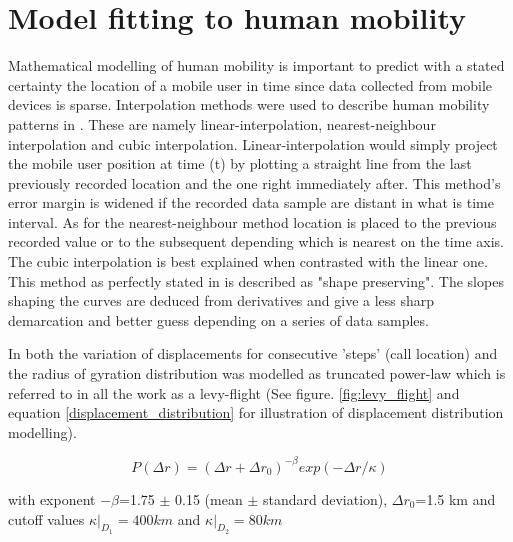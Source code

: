 \documentclass[12pt, a4paper]{report}
\theoremstyle{definition}
\theoremstyle{definition}%
\theoremstyle{definition}%
\theoremstyle{definition}%
\theoremstyle{definition}%
\theoremstyle{definition}%
\begin{document}
\section{Model fitting to human mobility} \label{methodology_modelling}
Mathematical modelling of human mobility is important to predict with a stated certainty the location of a mobile user in time since data collected from mobile devices is sparse. Interpolation methods were used to describe human mobility patterns in \cite{Hoteit2014}. These are namely linear-interpolation, nearest-neighbour interpolation and cubic interpolation. Linear-interpolation would simply project the mobile user position at time (t) by plotting a straight line from the last previously recorded location and the one right immediately after. This method's error margin is widened if the recorded data sample are distant in what is time interval. As for the nearest-neighbour method location is placed to the previous recorded value or to the subsequent depending which is nearest on the time axis. The cubic interpolation is best explained when contrasted with the linear one. This method as perfectly stated in \cite{Hoteit2014}  is described as "shape preserving". The slopes shaping the curves are deduced from derivatives and give a less sharp demarcation and better guess depending on a series of data samples.

In \cite{Gonzalez2008} both the variation of displacements for consecutive 'steps' (call location) and the radius of gyration distribution was modelled as truncated power-law which is referred to in all the work as a levy-flight (See figure. \ref{fig:levy_flight} and equation \ref{displacement_distribution} for illustration of displacement distribution modelling). 

\begin{equation}\label{displacement_distribution}
P(\Delta r) = (\Delta r + \Delta r_{0})^{-\beta}  exp(-\Delta r/\kappa)
\end{equation} 

with exponent $-\beta$=1.75 $\pm$ 0.15 (mean $\pm$ standard deviation), $\Delta r_{0}$=1.5 km and cutoff values $\kappa|_{D_{1}}=400 km$ and $\kappa|_{D_{2}}=80 km$ 
\end{document}
